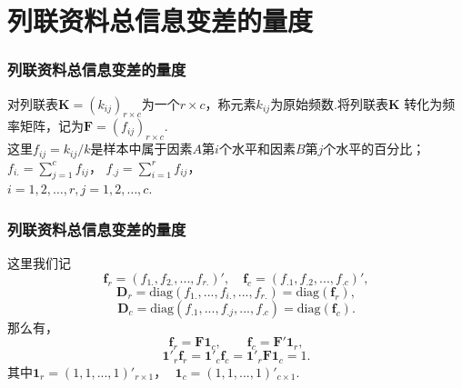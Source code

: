 


\section{列联资料总信息变差的量度}




\begin{frame}\frametitle{\color{blue}列联资料总信息变差的量度}

\begin{small}
\quad\quad {\color{magenta} {\hei 1. 有关记号}}
 \vskip0.5cm

 \quad\quad
对列联表$\mathbf{K}=(k_{ij})_{r\times c}$为一个$r\times
c$，称元素$k_{ij}$为原始频数.将列联表$\mathbf{K}$
转化为频率矩阵，记为$\mathbf{F}=(f_{ij})_{r\times c}$.\\
 \quad\quad
 这里$f_{ij}=k_{ij}/k$是样本中属于因素$A$第$i$个水平和因素$B$第$j$个水平的百分比；
$f_{i.}=\sum^{c}_{j=1}f_{ij}$， $f_{.j}=\sum^{r}_{i=1}f_{ij}$，\\
 $i=1,2,\ldots,r, j=1,2,\ldots,c$.

\end{small}
\end{frame}


\begin{frame}\frametitle{\color{blue}列联资料总信息变差的量度}
\begin{small}

\quad\quad
 这里我们记
    $$\mathbf{f}_{r}=(f_{1.},f_{2.},...,f_{r.})',\quad
    \mathbf{f}_{c}=(f_{.1},f_{.2},...,f_{.c})',$$
    $$\mathbf{D}_{r}={\mathrm{diag}}(f_{1.},...,f_{i.},...,f_{r.})={\mathrm{diag}}(\mathbf{f}_{r}),$$
    $$\mathbf{D}_{c}={\mathrm{diag}}(f_{.1},...,f_{.j},...,f_{.c})={\mathrm{diag}}(\mathbf{f}_{c}).$$
那么有，
    $$\mathbf{f}_{r}=\mathbf{F}\mathbf{1}_{c},\quad\quad \mathbf{f}_{c}=\mathbf{F}'\mathbf{1}_{r},$$
    $$\mathbf{1}'_{r}\mathbf{f}_{r}=\mathbf{1}'_{c}\mathbf{f}_{c}
       =\mathbf{1}'_{r}\mathbf{F}\mathbf{1}_{c}=1.$$
其中$\mathbf{1}_{r}=(1,1,...,1)'_{r\times 1}$，\,\,
$\mathbf{1}_{c}=(1,1,...,1)'_{c\times1}$.\\
\end{small}

\end{frame}



